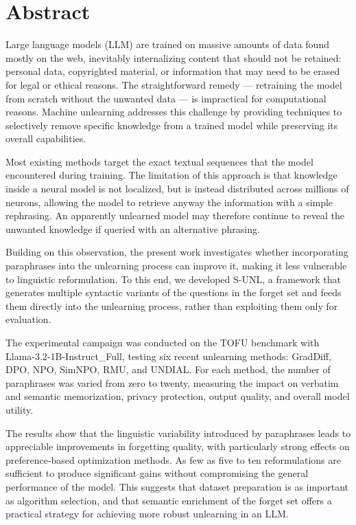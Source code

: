 
\chapter*{Abstract}

Large language models (LLM) are trained on massive amounts of data found mostly on the web, inevitably internalizing content that should not be retained: personal data, copyrighted material, or information that may need to be erased for legal or ethical reasons. The straightforward remedy — retraining the model from scratch without the unwanted data — is impractical for computational reasons. Machine unlearning addresses this challenge by providing techniques to selectively remove specific knowledge from a trained model while preserving its overall capabilities.

Most existing methods target the exact textual sequences that the model encountered during training. The limitation of this approach is that knowledge inside a neural model is not localized, but is instead distributed across millions of neurons, allowing the model to retrieve anyway the information with a simple rephrasing. An apparently unlearned model may therefore continue to reveal the unwanted knowledge if queried with an alternative phrasing.

Building on this observation, the present work investigates whether incorporating paraphrases into the unlearning process can improve it, making it less vulnerable to linguistic reformulation. To this end, we developed S-UNL, a framework that generates multiple syntactic variants of the questions in the forget set and feeds them directly into the unlearning process, rather than exploiting them only for evaluation.

The experimental campaign was conducted on the TOFU benchmark with Llama-3.2-1B-Instruct_Full, testing six recent unlearning methods: GradDiff, DPO, NPO, SimNPO, RMU, and UNDIAL. For each method, the number of paraphrases was varied from zero to twenty, measuring the impact on verbatim and semantic memorization, privacy protection, output quality, and overall model utility.

The results show that the linguistic variability introduced by paraphrases leads to appreciable improvements in forgetting quality, with particularly strong effects on preference-based optimization methods. As few as five to ten reformulations are sufficient to produce significant gains without compromising the general performance of the model. This suggests that dataset preparation is as important as algorithm selection, and that semantic enrichment of the forget set offers a practical strategy for achieving more robust unlearning in an LLM.
\vspace{1.5cm}

